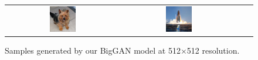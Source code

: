 \begin{figure}[htbp]
\begin{tabular}{cccc}
\includegraphics[width=0.24\textwidth]{images/samples1/512dog0.jpg} & 
\includegraphics[width=0.24\textwidth]{images/samples1/512rocket0.jpg} 
\end{tabular}
\caption{Samples generated by our BigGAN model at 512$\times$512 resolution.}
\label{appendix_samples512}
\end{figure}

